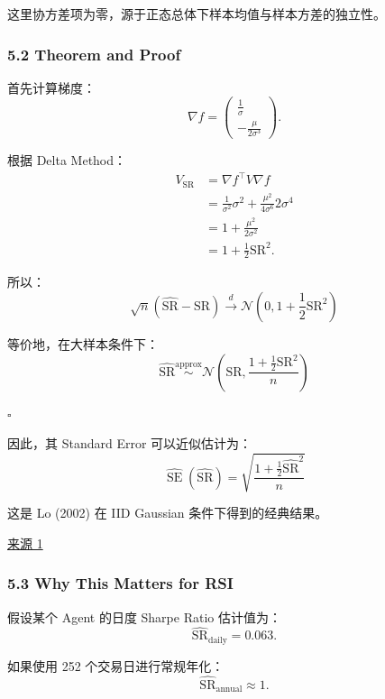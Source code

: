 这里协方差项为零，源于正态总体下样本均值与样本方差的独立性。

\hypertarget{part-4-67-0001-theorem-and-proof}{%
\subsubsection{5.2 Theorem and Proof}\label{part-4-67-0001-theorem-and-proof}}

首先计算梯度：
\[\nabla f
=
\begin{pmatrix}
\frac1\sigma\\[4pt]
-\frac{\mu}{2\sigma^3}
\end{pmatrix}.\]

根据 Delta Method：
\[\begin{aligned}
V_{\mathrm{SR}}
&=
\nabla f^\top V\nabla f\\
&=
\frac1{\sigma^2}\sigma^2
+
\frac{\mu^2}{4\sigma^6}2\sigma^4\\
&=
1+\frac{\mu^2}{2\sigma^2}\\
&=
1+\frac12\mathrm{SR}^2.
\end{aligned}\]

所以：
\[\boxed{
\sqrt n
(\widehat{\mathrm{SR}}-\mathrm{SR})
\xrightarrow{d}
\mathcal N
\left(
0,1+\frac12\mathrm{SR}^2
\right)
}\]

等价地，在大样本条件下：
\[\boxed{
\widehat{\mathrm{SR}}
\overset{\mathrm{approx}}{\sim}
\mathcal N
\left(
\mathrm{SR},
\frac{1+\frac12\mathrm{SR}^2}{n}
\right)
}\]

\(\square\)

因此，其 Standard Error 可以近似估计为：
\[\boxed{
\widehat{\operatorname{SE}}
(\widehat{\mathrm{SR}})
=
\sqrt{
\frac{1+\frac12\widehat{\mathrm{SR}}^2}{n}
}
}\]

这是 Lo (2002) 在 IID Gaussian 条件下得到的经典结果。

\href{https://rpc.cfainstitute.org/research/financial-analysts-journal/2002/the-statistics-of-sharpe-ratios}{来源 1}

\hypertarget{part-4-67-0001-why-this-matters-for-rsi}{%
\subsubsection{5.3 Why This Matters for RSI}\label{part-4-67-0001-why-this-matters-for-rsi}}

假设某个 Agent 的日度 Sharpe Ratio 估计值为：
\[\widehat{\mathrm{SR}}_{\mathrm{daily}}=0.063.\]

如果使用 252 个交易日进行常规年化：
\[\widehat{\mathrm{SR}}_{\mathrm{annual}}
\approx1.\]

